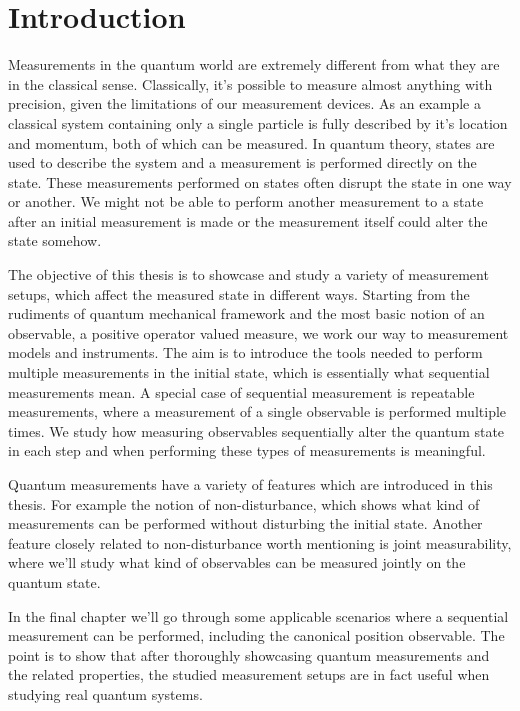\documentclass[a4paper,12pt]{wihuri}
\theoremstyle{definition}
\numberwithin{definition}{section}
\numberwithin{example}{section}
\numberwithin{theorem}{section}
\numberwithin{proposition}{section}
\numberwithin{lemma}{section}
\begin{document}

	


\tableofcontents %
\newpage
\section*{Introduction}
\thispagestyle{empty}
Measurements in the quantum world are extremely different from what they are in the classical sense. Classically, it's possible to measure almost anything with precision, given the limitations of our measurement devices. As an example a classical system containing only a single particle is fully described by it's location and momentum, both of which can be measured. In quantum theory, states are used to describe the system and a measurement is performed directly on the state. These measurements performed on states often disrupt the state in one way or another. We might not be able to perform another measurement to a state after an initial measurement is made or the measurement itself could alter the state somehow. 

The objective of this thesis is to showcase and study a variety of measurement setups, which affect the measured state in different ways. Starting from the rudiments of quantum mechanical framework and the most basic notion of an observable, a positive operator valued measure, we work our way to measurement models and instruments. The aim is to introduce the tools needed to perform multiple measurements in the initial state, which is essentially what sequential measurements mean. A special case of sequential measurement is repeatable measurements, where a measurement of a single observable is performed multiple times. We study how measuring observables sequentially alter the quantum state in each step and when performing these types of measurements is meaningful.

Quantum measurements have a variety of features which are introduced in this thesis. For example the notion of non-disturbance, which shows what kind of measurements can be performed without disturbing the initial state. Another feature closely related to non-disturbance worth mentioning is joint measurability, where we'll study what kind of observables can be measured jointly on the quantum state. 

In the final chapter we'll go through some applicable scenarios where a sequential measurement can be performed, including the canonical position observable. The point is to show that after thoroughly showcasing quantum measurements and the related properties, the studied measurement setups are in fact useful when studying real quantum systems.
\end{document}
